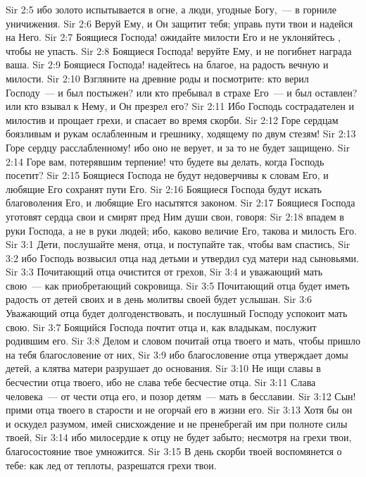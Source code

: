 \vs Sir 2:5 ибо золото испытывается в огне, а люди, угодные Богу,~--- в горниле уничижения.
\vs Sir 2:6 Веруй Ему, и Он защитит тебя; управь пути твои и надейся на Него.
\vs Sir 2:7 Боящиеся Господа! ожидайте милости Его и не уклоняйтесь , чтобы не упасть.
\vs Sir 2:8 Боящиеся Господа! веруйте Ему, и не погибнет награда ваша.
\vs Sir 2:9 Боящиеся Господа! надейтесь на благое, на радость вечную и милости.
\vs Sir 2:10 Взгляните на древние роды и посмотрите: кто верил Господу~--- и был постыжен? или кто пребывал в страхе Его~--- и был оставлен? или кто взывал к Нему, и Он презрел его?
\vs Sir 2:11 Ибо Господь сострадателен и милостив и прощает грехи, и спасает во время скорби.
\vs Sir 2:12 Горе сердцам боязливым и рукам ослабленным и грешнику, ходящему по двум стезям!
\vs Sir 2:13 Горе сердцу расслабленному! ибо оно не верует, и за то не будет защищено.
\vs Sir 2:14 Горе вам, потерявшим терпение! что будете вы делать, когда Господь посетит?
\vs Sir 2:15 Боящиеся Господа не будут недоверчивы к словам Его, и любящие Его сохранят пути Его.
\vs Sir 2:16 Боящиеся Господа будут искать благоволения Его, и любящие Его насытятся законом.
\vs Sir 2:17 Боящиеся Господа уготовят сердца свои и смирят пред Ним души свои, говоря:
\vs Sir 2:18 впадем в руки Господа, а не в руки людей; ибо, каково величие Его, такова и милость Его.
\vs Sir 3:1 Дети, послушайте меня, отца, и поступайте так, чтобы вам спастись,
\vs Sir 3:2 ибо Господь возвысил отца над детьми и утвердил суд матери над сыновьями.
\vs Sir 3:3 Почитающий отца очистится от грехов,
\vs Sir 3:4 и уважающий мать свою~--- как приобретающий сокровища.
\vs Sir 3:5 Почитающий отца будет иметь радость от детей своих и в день молитвы своей будет услышан.
\vs Sir 3:6 Уважающий отца будет долгоденствовать, и послушный Господу успокоит мать свою.
\vs Sir 3:7 Боящийся Господа почтит отца и, как владыкам, послужит родившим его.
\vs Sir 3:8 Делом и словом почитай отца твоего и мать, чтобы пришло на тебя благословение от них,
\vs Sir 3:9 ибо благословение отца утверждает домы детей, а клятва матери разрушает до основания.
\vs Sir 3:10 Не ищи славы в бесчестии отца твоего, ибо не слава тебе бесчестие отца.
\vs Sir 3:11 Слава человека~--- от чести отца его, и позор детям~--- мать в бесславии.
\vs Sir 3:12 Сын! прими отца твоего в старости  и не огорчай его в жизни его.
\vs Sir 3:13 Хотя бы он и оскудел разумом, имей снисхождение и не пренебрегай им при полноте силы твоей,
\vs Sir 3:14 ибо милосердие к отцу не будет забыто; несмотря на грехи твои, благосостояние твое умножится.
\vs Sir 3:15 В день скорби твоей воспомянется о тебе: как лед от теплоты, разрешатся грехи твои.
